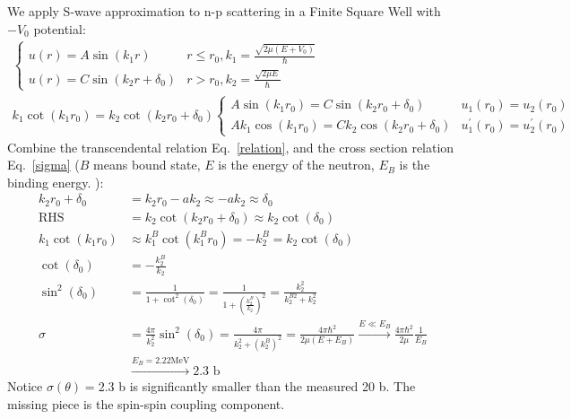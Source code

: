 \documentclass{school-22.101-notes}
\date{November 2, 2011}
\begin{document}
\maketitle

We apply S-wave approximation to n-p scattering in a Finite Square Well with $-V_0$ potential:
\begin{align}
\begin{cases}
u(r) = A \sin(k_1 r) & r \le r_0, k_1 = \frac{\sqrt{2 \mu (E+V_0)}}{\hbar} \\
u(r) = C \sin(k_2 r + \delta_0) & r > r_0, k_2 = \frac{\sqrt{2 \mu E}}{\hbar} 
\end{cases}
\\
\boxed{k_1 \cot (k_1 r_0) = k_2 \cot (k_2 r_0 + \delta_0) } \label{relation}
\begin{cases}
A \sin (k_1 r_0) = C \sin (k_2 r_0 + \delta_0) & u_1(r_0) = u_2(r_0) \\
A k_1 \cos (k_1 r_0) = C k_2 \cos (k_2 r_0 + \delta_0) & u^{\prime}_1 (r_0) = u_2^{\prime} (r_0) 
\end{cases}
\end{align}
Combine the transcendental relation Eq.~\ref{relation}, and the cross section relation Eq.~\ref{sigma} ($B$ means bound state, $E$ is the energy of the neutron, $E_B$ is the binding energy. ):
\begin{align}
k_2 r_0 + \delta_0 &= k_2 r_0 - ak_2 \approx -ak_2 \approx \delta_0 \\
\mathrm{RHS} &= k_2 \cot (k_2 r_0 + \delta_0) \approx k_2 \cot (\delta_0) \\
k_1 \cot (k_1 r_0) &\approx k_1^B \cot (k_1^B r_0) = - k_2^B  = k_2 \cot (\delta_0) \\
\cot (\delta_0) &= -\frac{k_2^B}{k_2} \\
\sin^2 (\delta_0) &= \frac{1}{1 + \cot^2 (\delta_0)} = \frac{1}{1 + \left( \frac{k_2^B}{k_2} \right)^2 } = \frac{k_2^2}{k_2^{B2} + k_2^2} \\
\sigma &= \frac{4\pi}{k_2^2} \sin^2 (\delta_0) = \frac{4\pi}{k_2^2 + \left(k_2^B \right)^2 } = \frac{4\pi \hbar^2}{2 \mu (E + E_B) } \xrightarrow{E \ll E_B} \frac{4 \pi \hbar^2}{2 \mu} \frac{1}{E_B} \\
&\xrightarrow{E_B = 2.22 \mathrm{ MeV}} 2.3 \mbox{ b} 
\end{align}
Notice $\sigma (\theta) = 2.3$ b is significantly smaller than the measured 20 b. The missing piece is the spin-spin coupling component.
\end{document}
